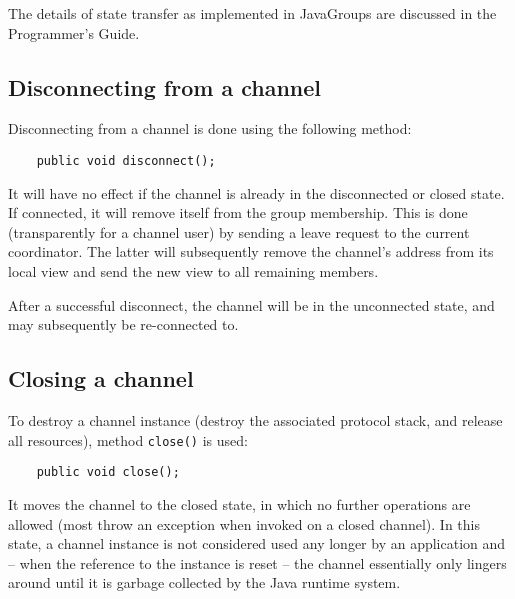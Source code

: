 	

    The details of state transfer as implemented in JavaGroups are discussed in the
    Programmer's Guide.






    \subsection{Disconnecting from a channel}

    Disconnecting from a channel is done using the following method:

    \begin{small}
    \begin{verbatim}
    public void disconnect();
    \end{verbatim}
    \end{small}

    It will have no effect if the channel is already in the disconnected or closed
    state. If connected, it will remove itself from the group membership. This is
    done (transparently for a channel user) by sending a leave request to the current
    coordinator. The latter will subsequently remove the channel's address from its
    local view and send the new view to all remaining members.

    After a successful disconnect, the channel will be in the unconnected state, and
    may subsequently be re-connected to.



    \subsection{Closing a channel}

    To destroy a channel instance (destroy the associated protocol stack, and release
    all resources), method {\tt close()} is used:

    \begin{small}
    \begin{verbatim}
    public void close();
    \end{verbatim}
    \end{small}

    It moves the channel to the closed state, in which no further operations are
    allowed (most throw an exception when invoked on a closed channel). In this
    state, a channel instance is not considered used any longer by an application and
    -- when the reference to the instance is reset -- the channel essentially only
    lingers around until it is garbage collected by the Java runtime system.





    







